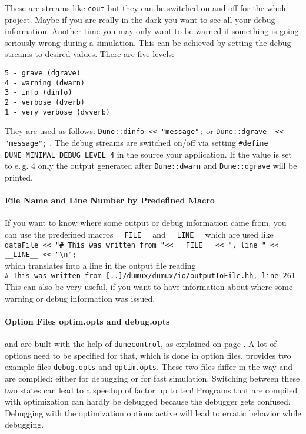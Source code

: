   These are streams like \texttt{cout} but they can be switched on and off for the whole project.
  Maybe if you are really in the  dark you want to see all your debug information. Another time you may only want to be warned if something is going seriously wrong during a simulation.
  This can be achieved by setting the debug streams to desired values. There are five levels:
\begin{verbatim}
5 - grave (dgrave)
4 - warning (dwarn)
3 - info (dinfo)
2 - verbose (dverb)
1 - very verbose (dvverb)
\end{verbatim}

They are used as follows: \lstinline{Dune::dinfo << "message";} or \lstinline{Dune::dgrave  << "message";} .
The debug streams are switched on/off via  setting \lstinline{#define DUNE_MINIMAL_DEBUG_LEVEL 4}
in the source your application. If the value is set to e.\,g. 4 only the output generated after
\lstinline{Dune::dwarn} and \lstinline{Dune::dgrave} will be printed.


\paragraph{File Name and Line Number by Predefined Macro}
If you want to  know where some output or debug information came from, you can use the predefined macros \lstinline{__FILE__} and \lstinline{__LINE__}
which are used like\\
\lstinline{dataFile << "# This was written from "<< __FILE__ << ", line " << __LINE__ << "\n";}\\
which translates into a line in the output file reading\\
\lstinline{# This was written from [..]/dumux/dumux/io/outputToFile.hh, line 261}\\
This can also be very useful, if you want to have information about where some warning or debug information was issued.

\paragraph{Option Files optim.opts and debug.opts}
\Dune and \Dumux are built with the help of \texttt{dunecontrol}, as explained on page \pageref{buildIt}.
A lot of options need to be specified for that, which is done in option files. \Dumux provides two example files
\texttt{debug.opts} and \texttt{optim.opts}. These two files differ in the way \Dune and \Dumux are compiled:
either for debugging or for fast simulation. Switching between these two states can lead to a speedup of factor up to ten!
Programs that are compiled with optimization can hardly be debugged because the debugger gets confused.
Debugging with the optimization options active will lead to erratic behavior while debugging.

